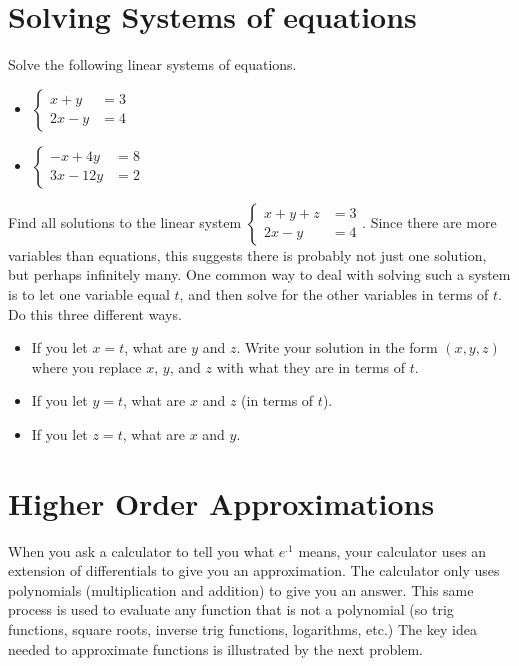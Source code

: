 \section{Solving Systems of equations}


\begin{problem}
		Solve the following linear systems of equations.
\begin{itemize}
\item $\begin{cases}x+y&=3\\2x-y&=4\end{cases}$
\item $\begin{cases}-x + 4y&=8\\3x - 12y&=2\end{cases}$
\end{itemize}
\end{problem}

\begin{problem}
Find all solutions to the linear system 
$\begin{cases}x+y+z&=3\\2x-y&=4\end{cases}$.  
Since there are more variables than equations, this suggests there is probably not just one solution, but perhaps infinitely many.  One common way to deal with solving such a system is to let one variable equal $t$, and then solve for the other variables in terms of $t$. Do this three different ways.
\begin{itemize}
\item If you let $x=t$, what are $y$ and $z$.  Write your solution in the form $(x,y,z)$ where you replace $x$, $y$, and $z$ with what they are in terms of $t$.
\item If you let $y=t$, what are $x$ and $z$ (in terms of $t$).
\item If you let $z=t$, what are $x$ and $y$.
\end{itemize}
\end{problem}


\section{Higher Order Approximations} 
When you ask a calculator to tell you what $e^{.1}$ means, your calculator uses an extension of differentials to give you an approximation.  The calculator only uses polynomials (multiplication and addition) to give you an answer.  This same process is used to evaluate any function that is not a polynomial (so trig functions, square roots, inverse trig functions, logarithms, etc.) 
The key idea needed to approximate functions is illustrated by the next problem.

